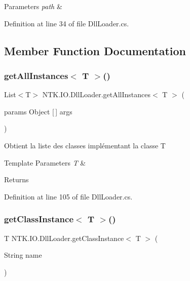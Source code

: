 \begin{DoxyParams}{Parameters}
{\em path} & \\
\hline
\end{DoxyParams}


Definition at line 34 of file Dll\+Loader.\+cs.



\subsection{Member Function Documentation}
\mbox{\label{class_n_t_k_1_1_i_o_1_1_dll_loader_a64a29004a749655382830040714013fd}} 
\subsubsection{\texorpdfstring{getAllInstances$<$ T $>$()}{getAllInstances< T >()}}
{\footnotesize\ttfamily List$<$T$>$ N\+T\+K.\+I\+O.\+Dll\+Loader.\+get\+All\+Instances$<$ T $>$ (\begin{DoxyParamCaption}\item[{params Object \mbox{[}$\,$\mbox{]}}]{args }\end{DoxyParamCaption})}



Obtient la liste des classes implémentant la classe T 


\begin{DoxyTemplParams}{Template Parameters}
{\em T} & \\
\hline
\end{DoxyTemplParams}
\begin{DoxyReturn}{Returns}

\end{DoxyReturn}


Definition at line 105 of file Dll\+Loader.\+cs.

\mbox{\label{class_n_t_k_1_1_i_o_1_1_dll_loader_a6056f6798ccb621f64da1654848b0429}} 
\subsubsection{\texorpdfstring{getClassInstance$<$ T $>$()}{getClassInstance< T >()}}
{\footnotesize\ttfamily T N\+T\+K.\+I\+O.\+Dll\+Loader.\+get\+Class\+Instance$<$ T $>$ (\begin{DoxyParamCaption}\item[{String}]{name }\end{DoxyParamCaption})}



